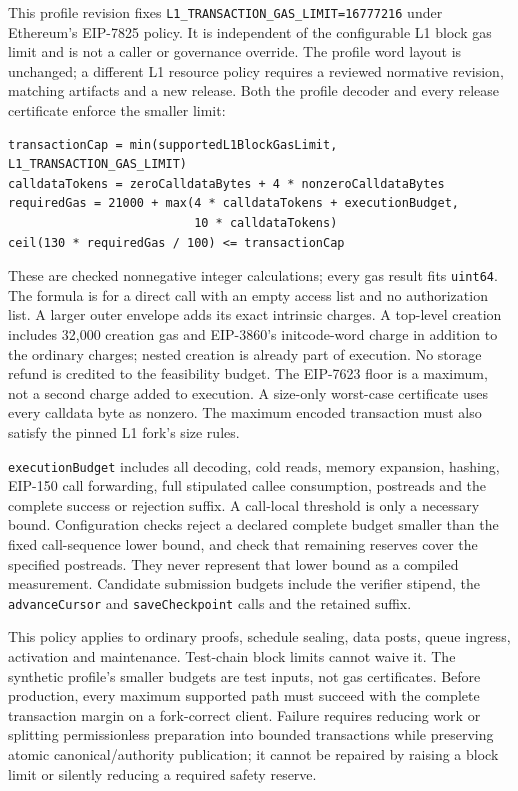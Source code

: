 \documentclass[a4paper,11pt]{article}
\newcommand{\code}[1]{\nolinkurl{#1}}
\begin{document}
This profile revision fixes \code{L1_TRANSACTION_GAS_LIMIT=16777216}
under Ethereum's EIP-7825 policy.  It is independent of the configurable L1
block gas limit and is not a caller or governance override.  The profile word
layout is unchanged; a different L1 resource policy requires a reviewed
normative revision, matching artifacts and a new release.  Both the profile
decoder and every release certificate enforce the smaller limit:
\begin{verbatim}
transactionCap = min(supportedL1BlockGasLimit, L1_TRANSACTION_GAS_LIMIT)
calldataTokens = zeroCalldataBytes + 4 * nonzeroCalldataBytes
requiredGas = 21000 + max(4 * calldataTokens + executionBudget,
                          10 * calldataTokens)
ceil(130 * requiredGas / 100) <= transactionCap
\end{verbatim}
These are checked nonnegative integer calculations; every gas result fits
\code{uint64}.  The formula is for a direct call with an empty access list and
no authorization list.  A larger outer envelope adds its exact intrinsic
charges.  A top-level creation includes 32,000 creation gas and EIP-3860's
initcode-word charge in addition to the ordinary charges; nested creation is
already part of execution.  No storage refund is credited to the feasibility
budget.  The EIP-7623 floor is a maximum, not a second charge added to
execution.  A size-only worst-case certificate uses every calldata byte as
nonzero.  The maximum encoded transaction must also satisfy the pinned L1
fork's size rules.

\code{executionBudget} includes all decoding, cold reads, memory expansion,
hashing, EIP-150 call forwarding, full stipulated callee consumption, postreads
and the complete success or rejection suffix.  A call-local threshold is only
a necessary bound.  Configuration checks reject a declared complete budget
smaller than the fixed call-sequence lower bound, and check that remaining
reserves cover the specified postreads.  They never represent that lower bound
as a compiled measurement.  Candidate submission budgets include the verifier stipend, the
\code{advanceCursor} and \code{saveCheckpoint} calls and the retained
suffix.

This policy applies to ordinary proofs, schedule sealing, data posts, queue
ingress, activation and maintenance.  Test-chain block limits cannot waive it.  The synthetic
profile's smaller budgets are test inputs, not gas certificates.  Before
production, every maximum supported path must succeed with the complete
transaction margin on a fork-correct client.  Failure requires reducing work
or splitting permissionless preparation into bounded transactions while
preserving atomic canonical/authority publication; it cannot be repaired by
raising a block limit or silently reducing a required safety reserve.
\end{document}
